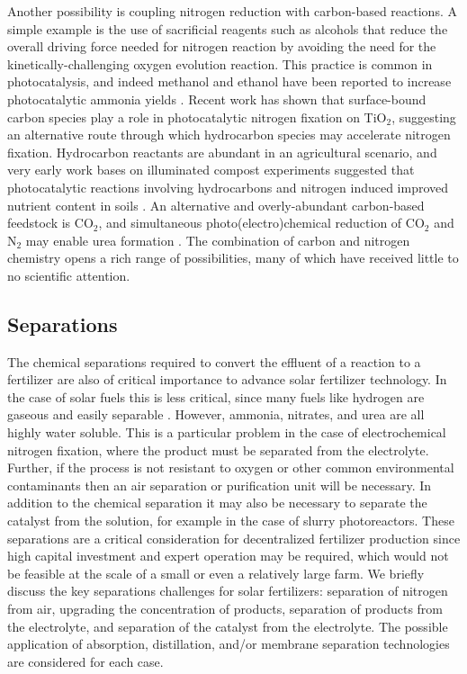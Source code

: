 Another possibility is coupling nitrogen reduction with carbon-based reactions. A simple example is the use of sacrificial reagents such as alcohols that reduce the overall driving force needed for nitrogen reaction by avoiding the need for the kinetically-challenging oxygen evolution reaction. This practice is common in photocatalysis, and indeed methanol and ethanol have been reported to increase photocatalytic ammonia yields \needcite. Recent work has shown that surface-bound carbon species play a role in photocatalytic nitrogen fixation on TiO$_2$, suggesting an alternative route through which hydrocarbon species may accelerate nitrogen fixation. Hydrocarbon reactants are abundant in an agricultural scenario, and very early work bases on illuminated compost experiments suggested that photocatalytic reactions involving hydrocarbons and nitrogen induced improved nutrient content in soils \needcite. An alternative and overly-abundant carbon-based feedstock is CO$_2$, and simultaneous photo(electro)chemical reduction of CO$_2$ and N$_2$ may enable urea formation \needcite. The combination of carbon and nitrogen chemistry opens a rich range of possibilities, many of which have received little to no scientific attention. 

\subsection{Separations}
\label{sec:separation}

The chemical separations required to convert the effluent of a reaction to a fertilizer are also of critical importance to advance solar fertilizer technology. In the case of solar fuels this is less critical, since many fuels like hydrogen are gaseous and easily separable \needcite. However, ammonia, nitrates, and urea are all highly water soluble. This is a particular problem in the case of electrochemical nitrogen fixation, where the product must be separated from the electrolyte. Further, if the process is not resistant to oxygen or other common environmental contaminants then an air separation or purification unit will be necessary. In addition to the chemical separation it may also be necessary to separate the catalyst from the solution, for example in the case of slurry photoreactors. These separations are a critical consideration for decentralized fertilizer production since high capital investment and expert operation may be required, which would not be feasible at the scale of a small or even a relatively large farm. We briefly discuss the key separations challenges for solar fertilizers: separation of nitrogen from air, upgrading the concentration of products, separation of products from the electrolyte, and separation of the catalyst from the electrolyte. The possible application of absorption, distillation, and/or membrane separation technologies are considered for each case.

